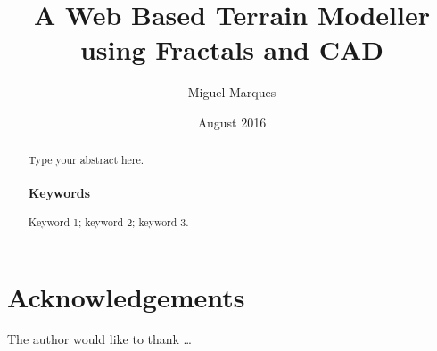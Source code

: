 \documentclass[12pt, chapterprefix=false, oneside]{book}
\title{A Web Based Terrain Modeller using Fractals and CAD}
\author{Miguel Marques}
\date{August 2016}
\begin{document}
%
%

\frontmatter

\maketitle

\begin{abstract}
    Type your abstract here.

	\subsubsection*{Keywords}
	Keyword 1; keyword 2; keyword 3.
\end{abstract}

\chapter{Acknowledgements}
The author would like to thank \dots

\sstableofcontents

\sslistoffigures

\sslistoftables

\sslistofequations

\begin{listofabbreviations}
\end{listofabbreviations}


%
%
\mainmatter








\begin{references}
	
\end{references}

%
\end{document}
